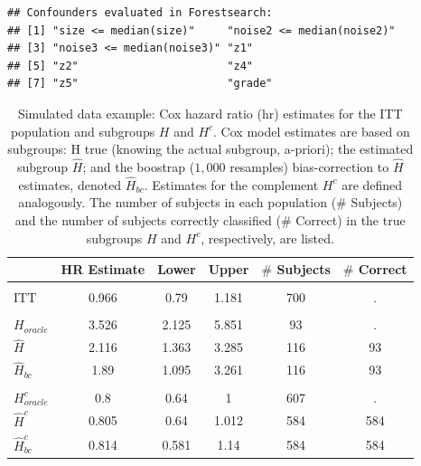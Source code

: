 \documentclass[smallextended]{svjour3}
\makeatletter
\newenvironment{kframe}{%
 \def\at@end@of@kframe{}%
 \ifinner\ifhmode%
  \def\at@end@of@kframe{\end{minipage}}%
  \begin{minipage}{\columnwidth}%
 \fi\fi%
 \def\FrameCommand##1{\hskip\@totalleftmargin \hskip-\fboxsep
 \colorbox{shadecolor}{##1}\hskip-\fboxsep
     \hskip-\linewidth \hskip-\@totalleftmargin \hskip\columnwidth}%
 \MakeFramed {\advance\hsize-\width
   \@totalleftmargin\z@ \linewidth\hsize
   \@setminipage}}%
 {\par\unskip\endMakeFramed%
 \at@end@of@kframe}
\newenvironment{knitrout}{}{} %
\makeatother
\begin{document}
\begin{knitrout}
\color{fgcolor}\begin{kframe}
\begin{verbatim}
## Confounders evaluated in Forestsearch:
## [1] "size <= median(size)"     "noise2 <= median(noise2)"
## [3] "noise3 <= median(noise3)" "z1"                      
## [5] "z2"                       "z4"                      
## [7] "z5"                       "grade"
\end{verbatim}
\end{kframe}
\end{knitrout}





\begin{table}

\caption{\label{tab:simex_tab}\label{tab:simex} Simulated data example: Cox hazard ratio (hr) estimates for the ITT population and subgroups $H$ and $H^{c}$.
Cox model estimates are based on subgroups: H true (knowing the actual subgroup, a-priori); the estimated subgroup $\hat{H}$; and 
the boostrap ($1,000$ resamples) bias-correction to $\hat{H}$ estimates, denoted $\hat{H}_{bc}$.  Estimates for the complement $H^{c}$ are defined analogously.
The number of subjects in each population ($\#$ Subjects) and the number of subjects correctly classified ($\#$ Correct) in the true subgroups $H$ and $H^{c}$, respectively, are listed.}
\centering
\fontsize{9}{11}\selectfont
\begin{tabular}[t]{lccccc}
\toprule
  & HR Estimate & Lower & Upper & $\#$ Subjects & $\#$ Correct\\
\midrule
\addlinespace[0.3em]
\multicolumn{6}{l}{\textbf{ITT}}\\
\hspace{1em}ITT & 0.966 & 0.79 & 1.181 & 700 & .\\
\addlinespace[0.3em]
\multicolumn{6}{l}{\textbf{H subgroup estimates}}\\
\hspace{1em}$H_{oracle}$ & 3.526 & 2.125 & 5.851 & 93 & .\\
\hspace{1em}$\hat{H}$ & 2.116 & 1.363 & 3.285 & 116 & 93\\
\hspace{1em}$\hat{H}_{bc}$ & 1.89 & 1.095 & 3.261 & 116 & 93\\
\addlinespace[0.3em]
\multicolumn{6}{l}{\textbf{H-complement subgroup estimates}}\\
\hspace{1em}$H^{c}_{oracle}$ & 0.8 & 0.64 & 1 & 607 & .\\
\hspace{1em}$\hat{H}^{c}$ & 0.805 & 0.64 & 1.012 & 584 & 584\\
\hspace{1em}$\hat{H}^{c}_{bc}$ & 0.814 & 0.581 & 1.14 & 584 & 584\\
\bottomrule
\end{tabular}
\end{table}





\end{document}
